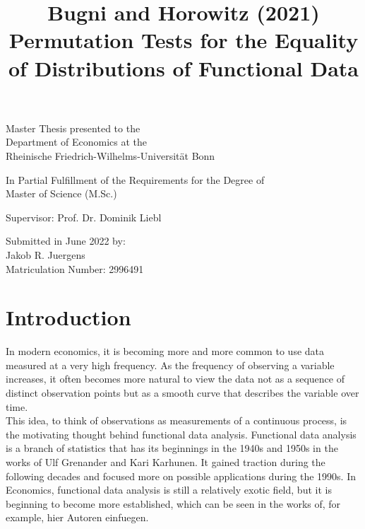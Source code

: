 \documentclass[11pt,twoside,a4paper]{article}
\theoremstyle{MAstyle} \newtheorem{assumption}{Assumption}
\theoremstyle{MAstyle} \newtheorem{definition}{Definition}
\begin{document}
	
	\title{{\huge Bugni and Horowitz (2021) Permutation Tests for the Equality of Distributions of Functional Data}}
	\date{}
	\maketitle
	\thispagestyle{empty}
	\vspace{1.5 cm}
	\begin{center}
		
		\Large
		Master Thesis presented to the\\
		Department of Economics at the\\
		Rheinische Friedrich-Wilhelms-Universität Bonn
		\vspace{1.5cm}

		\large
		In Partial Fulfillment of the Requirements for the Degree of\\
		Master of Science (M.Sc.)
		
		\vspace{3cm}
		
		Supervisor: Prof. Dr. Dominik Liebl
		
		\vspace{3cm}
		
		Submitted in June 2022 by: \\
		Jakob R. Juergens\\
		Matriculation Number: 2996491
	\end{center}
	
	\newpage
	
	\thispagestyle{empty}
	\tableofcontents
	
	\newpage
	
	\section{Introduction}
		In modern economics, it is becoming more and more common to use data measured at a very high frequency. As the frequency of observing a variable increases, it often becomes more natural to view the data not as a sequence of distinct observation points but as a smooth curve that describes the variable over time. \\
		This idea, to think of observations as measurements of a continuous process, is the motivating thought behind functional data analysis. Functional data analysis is a branch of statistics that has its beginnings in the 1940s and 1950s in the works of Ulf Grenander and Kari Karhunen. It gained traction during the following decades and focused more on possible applications during the 1990s. In Economics, functional data analysis is still a relatively exotic field, but it is beginning to become more established, which can be seen in the works of, for example, {\color{red} hier Autoren einfuegen}.
		
\end{document}
